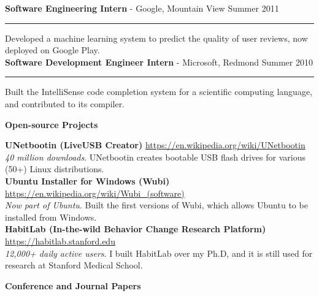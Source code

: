 \documentclass[10pt,A4]{article}
\newcommand{\cvsection}[1]
{
	\begin{center}
		\large\textcolor{sectcol}{\textbf{#1}}
	\end{center}
}
\newcommand{\cvevtone}[4]
{

	\textbf{#2} - \textcolor{bgcol}{#3} \hfill \vspace{2.5pt}\textcolor{sectcol}{#1}

\vspace{-8pt}
\textcolor{softcol}{\hrule}
\vspace{6pt}

  #4\\[3pt]

}
\begin{document}
\cvevtone{Summer 2011}{Software Engineering Intern}{Google, Mountain View}{Developed a machine learning system to predict the quality of user reviews, now deployed on Google Play.}

\cvevtone{Summer 2010}{Software Development Engineer Intern}{Microsoft, Redmond}{Built the IntelliSense code completion system for a scientific computing language, and contributed to its compiler.}


\cvsection{Open-source Projects}

\textbf{UNetbootin (LiveUSB Creator)} \hfill \url{https://en.wikipedia.org/wiki/UNetbootin}\\ %
\emph{40 million downloads}. UNetbootin creates bootable USB flash drives for various (50+) Linux distributions.\\ %

\textbf{Ubuntu Installer for Windows (Wubi)} \hfill \url{https://en.wikipedia.org/wiki/Wubi_(software)}\\ %
\emph{Now part of Ubuntu}. Built the first versions of Wubi, which allows Ubuntu to be installed from Windows.\\ %

\textbf{HabitLab (In-the-wild Behavior Change Research Platform)} \hfill \url{https://habitlab.stanford.edu}\\ %
\emph{12,000+ daily active users}. I built HabitLab over my Ph.D, and it is still used for research at Stanford Medical School.\\ %


\cvsection{Conference and Journal Papers}
\end{document}
